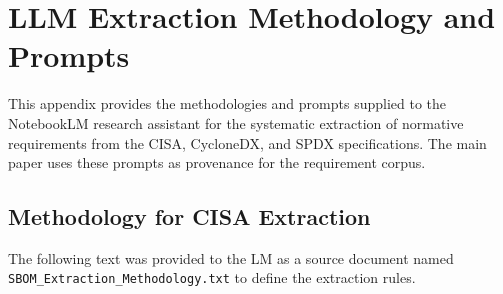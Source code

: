 \section{LLM Extraction Methodology and Prompts}
\label{app:prompts}

This appendix provides the methodologies and prompts supplied to the NotebookLM research assistant for the systematic extraction of normative requirements from the CISA, CycloneDX, and SPDX specifications. The main paper uses these prompts as provenance for the requirement corpus.

\subsection{Methodology for CISA Extraction}

The following text was provided to the LM as a source document named \texttt{SBOM\_Extraction\_Methodology.txt} to define the extraction rules.

